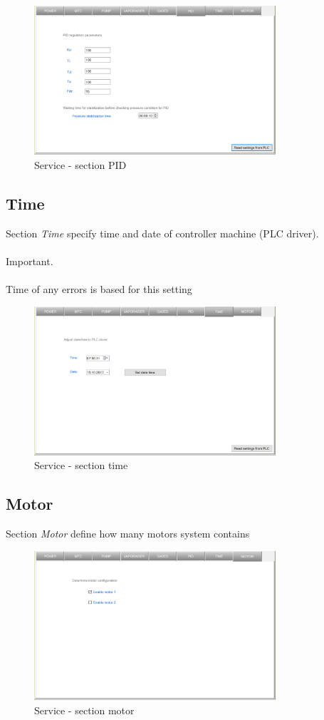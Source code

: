 	\begin{figure}[!h] 
	\centering \includegraphics[width=0.8\textwidth]{Graphic/Service/PID.png}	
	\caption{Service - section PID}
	\label{alerts_window}
	\end{figure}
	\FloatBarrier

\subsection{Time}

Section \textit{Time} specify  time and date of controller machine (PLC driver).\\\\
Important.\\\\
Time of any errors is based for this setting

	\begin{figure}[!h] 
	\centering \includegraphics[width=0.8\textwidth]{Graphic/Service/Time.png}	
	\caption{Service - section time}
	\label{alerts_window}
	\end{figure}
	\FloatBarrier

\subsection{Motor}

Section \textit{Motor} define how many motors system contains

	\begin{figure}[!h] 
	\centering \includegraphics[width=0.8\textwidth]{Graphic/Service/Motor.png}	
	\caption{Service - section motor}
	\label{alerts_window}
	\end{figure}
	\FloatBarrier
